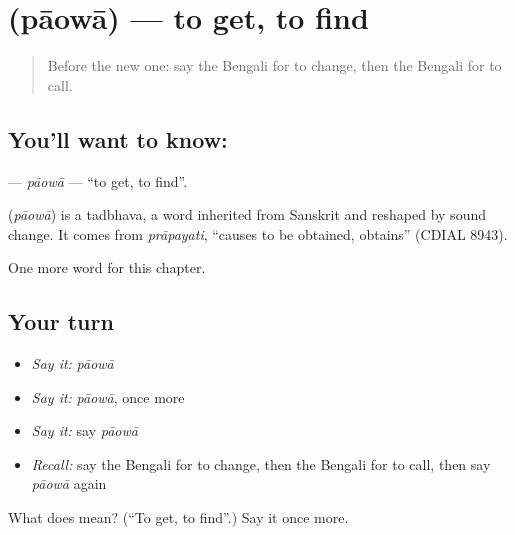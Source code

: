 \section[\texorpdfstring{\bn{পাওয়া} (pāowā)}{পাওয়া (pāowā)}]{ (pāowā) — to get, to find}

\label{lesson:BN-C55-paowa}



\begin{quote}
Before the new one: say the Bengali for to change, then the Bengali for to call.
\end{quote}

\subsection*{You'll want to know: }
\textbf{} — \emph{pāowā} — \textquotedblleft{}to get, to find\textquotedblright{}.

\begin{cousinweb}
\textbf{} (\emph{pāowā}) is a tadbhava, a word inherited from Sanskrit and reshaped by sound change. It comes from \emph{prāpayati}, \textquotedblleft{}causes to be obtained, obtains\textquotedblright{} (CDIAL 8943).
\end{cousinweb}

\begin{grammarlens}[title={What you've built}]
One more word for this chapter.
\end{grammarlens}

\subsection*{Your turn}
\begin{itemize}
\raggedright
  \item \emph{Say it:} \emph{pāowā}
  \item \emph{Say it:} \emph{pāowā}, once more
  \item \emph{Say it:} say \emph{pāowā}
  \item \emph{Recall:} say the Bengali for to change, then the Bengali for to call, then say \emph{pāowā} again
\end{itemize}

\begin{tcolorbox}[breakable,colback=teal!4,colframe=teal!35!black,title={Before you move on}]
What does  mean? (\textquotedblleft{}To get, to find\textquotedblright{}.) Say it once more.
\end{tcolorbox}
